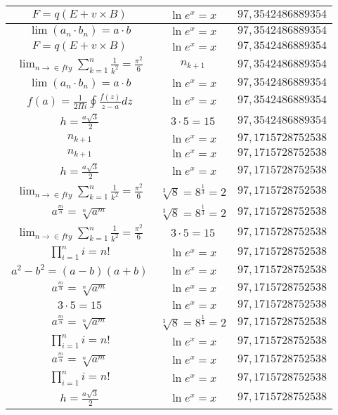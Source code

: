 \documentclass{article}
\begin{document}
\begin{flushleft}
\begin{longtable}{|c|c|c|}
$F=q\left(E+v\times B\right)$ & $\ln e^x=x$ & $97,3542486889354$ \\ \hline 
$\lim\left(a_n\cdot b_n\right)=a\cdot b$ & $\ln e^x=x$ & $97,3542486889354$ \\ \hline 
$F=q\left(E+v\times B\right)$ & $\ln e^x=x$ & $97,3542486889354$ \\ \hline 
$\lim_{n\to\in fty}\sum_{k=1}^n\frac{1}{k^2}=\frac{\pi^2}{6}$ & $n_{k+1}$ & $97,3542486889354$ \\ \hline 
$\lim\left(a_n\cdot b_n\right)=a\cdot b$ & $\ln e^x=x$ & $97,3542486889354$ \\ \hline 
$f\left(a\right)=\frac{1}{2\Pi i}\oint\frac{f\left(z\right)}{z-a}dz$ & $\ln e^x=x$ & $97,3542486889354$ \\ \hline 
$h=\frac{a\sqrt{3}}{2}$ & $3\cdot 5=15$ & $97,3542486889354$ \\ \hline 
$n_{k+1}$ & $\ln e^x=x$ & $97,1715728752538$ \\ \hline 
$n_{k+1}$ & $\ln e^x=x$ & $97,1715728752538$ \\ \hline 
$h=\frac{a\sqrt{3}}{2}$ & $\ln e^x=x$ & $97,1715728752538$ \\ \hline 
$\lim_{n\to\in fty}\sum_{k=1}^n\frac{1}{k^2}=\frac{\pi^2}{6}$ & $\sqrt[3]{8}=8^{\frac{1}{3}}=2$ & $97,1715728752538$ \\ \hline 
$a^{\frac{m}{n}}=\sqrt[n]{a^{m}}$ & $\sqrt[3]{8}=8^{\frac{1}{3}}=2$ & $97,1715728752538$ \\ \hline 
$\lim_{n\to\in fty}\sum_{k=1}^n\frac{1}{k^2}=\frac{\pi^2}{6}$ & $3\cdot 5=15$ & $97,1715728752538$ \\ \hline 
$\prod_{i=1}^ni=n!$ & $\ln e^x=x$ & $97,1715728752538$ \\ \hline 
$a^2-b^2=(a-b)(a+b)$ & $\ln e^x=x$ & $97,1715728752538$ \\ \hline 
$a^{\frac{m}{n}}=\sqrt[n]{a^{m}}$ & $\ln e^x=x$ & $97,1715728752538$ \\ \hline 
$3\cdot 5=15$ & $\ln e^x=x$ & $97,1715728752538$ \\ \hline 
$a^{\frac{m}{n}}=\sqrt[n]{a^{m}}$ & $\sqrt[3]{8}=8^{\frac{1}{3}}=2$ & $97,1715728752538$ \\ \hline 
$\prod_{i=1}^ni=n!$ & $\ln e^x=x$ & $97,1715728752538$ \\ \hline 
$a^{\frac{m}{n}}=\sqrt[n]{a^{m}}$ & $\ln e^x=x$ & $97,1715728752538$ \\ \hline 
$\prod_{i=1}^ni=n!$ & $\ln e^x=x$ & $97,1715728752538$ \\ \hline 
$h=\frac{a\sqrt{3}}{2}$ & $\ln e^x=x$ & $97,1715728752538$ \\ \hline 

\end{longtable}
\end{flushleft}
\end{document}
